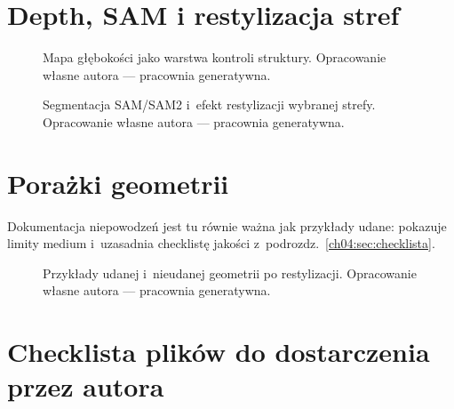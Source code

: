 \section{Depth, SAM i restylizacja stref}
\label{app:g:sec:structure}

\begin{figure}[htbp]
  \centering
  \caption{Mapa głębokości jako warstwa kontroli struktury.
  Opracowanie własne autora --- pracownia generatywna.}
  \label{app:g:fig:depth}
\end{figure}

\begin{figure}[htbp]
  \centering
  \caption{Segmentacja SAM/SAM2 i~efekt restylizacji wybranej strefy.
  Opracowanie własne autora --- pracownia generatywna.}
  \label{app:g:fig:sam}
\end{figure}

\section{Porażki geometrii}
\label{app:g:sec:failures}

Dokumentacja niepowodzeń jest tu równie ważna jak przykłady udane: pokazuje limity medium i~uzasadnia checklistę jakości z~podrozdz.~\ref{ch04:sec:checklista}.

\begin{figure}[htbp]
  \centering
  \caption{Przykłady udanej i~nieudanej geometrii po restylizacji.
  Opracowanie własne autora --- pracownia generatywna.}
  \label{app:g:fig:geometry}
\end{figure}

\section{Checklista plików do dostarczenia przez autora}
\label{app:g:sec:checklist-files}

